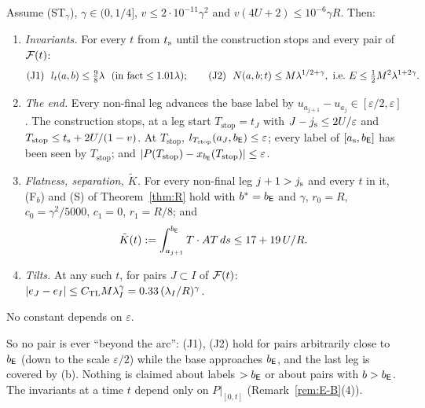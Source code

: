 \begin{theorem}\label{thm:End}
Assume \textup{(ST$_\gamma$)}, $\gamma\in(0,1/4]$, $v\le2\cdot10^{-11}\gamma^2$ and $v(4U+2)\le10^{-6}\gamma R$. Then:
\begin{enumerate}
\item[(a)] \emph{Invariants.} For every $t$ from $t_{\mathrm s}$ until the construction stops and every pair of $\mathcal F(t)$:
\begin{equation}\label{eq:E-J}
\textup{(J1)}\ \ l_t(a,b)\le\tfrac98\lambda\ \ (\text{in fact}\le1.01\lambda);\qquad
\textup{(J2)}\ \ N(a,b;t)\le M\lambda^{1/2+\gamma},\ \text{i.e.\ }E\le\tfrac12M^2\lambda^{1+2\gamma}.
\end{equation}
\item[(b)] \emph{The end.} Every non-final leg advances the base label by $u_{a_{j+1}}-u_{a_j}\in[\varepsilon/2,\varepsilon]$. The
construction stops, at a leg start $T_{\mathrm{stop}}=t_J$ with $J-j_{\mathrm s}\le2U/\varepsilon$ and
$T_{\mathrm{stop}}\le t_{\mathrm s}+2U/(1-v)$. At $T_{\mathrm{stop}}$, $l_{T_{\mathrm{stop}}}(a_J,b_{\mathsf E})\le\varepsilon$; every label of
$[a_{\mathrm s},b_{\mathsf E}]$ has been seen by $T_{\mathrm{stop}}$; and $|P(T_{\mathrm{stop}})-x_{b_{\mathsf E}}(T_{\mathrm{stop}})|\le\varepsilon$.
\item[(c)] \emph{Flatness, separation, $\tilde K$.} For every non-final leg $j+1>j_{\mathrm s}$ and every $t$ in it, \textup{(F$_b$)} and
\textup{(S)} of Theorem~\ref{thm:R} hold with $b^*=b_{\mathsf E}$ and $\gamma$, $r_0=R$, $c_0=\gamma^2/5000$, $c_1=0$, $r_1=R/8$; and
\[
\tilde K(t):=\int_{a_{j+1}}^{b_{\mathsf E}}T\cdot AT\,ds\le17+19\,U/R .
\]
\item[(d)] \emph{Tilts.} At any such $t$, for pairs $J\subset I$ of $\mathcal F(t)$:
$|e_J-e_I|\le C_{\mathrm{TL}} M\lambda_I^\gamma=0.33\,(\lambda_I/R)^\gamma$.
\end{enumerate}
No constant depends on $\varepsilon$.
\end{theorem}

So no pair is ever ``beyond the arc'': (J1), (J2) hold for pairs arbitrarily close to $b_{\mathsf E}$ (down to the scale $\varepsilon/2$)
while the base approaches $b_{\mathsf E}$, and the last leg is covered by (b). Nothing is claimed about labels $>b_{\mathsf E}$ or about pairs with
$b>b_{\mathsf E}$. The invariants at a time $t$ depend only on $P|_{[0,t]}$ (Remark~\ref{rem:E-B}(4)).

